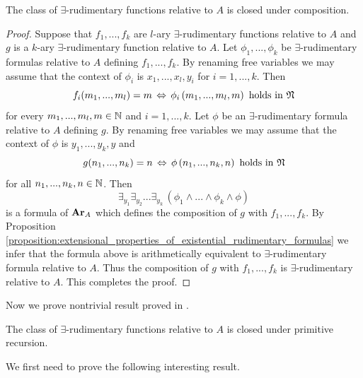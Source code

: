 \documentclass[10pt]{amsart}
\begin{document}
\begin{proposition}\label{proposition:class_of_existential_rudimentary_functions_is_closed_under_composition}
	The class of $\exists$-rudimentary functions relative to $A$ is closed under composition.
\end{proposition}
\begin{proof}
	Suppose that $f_1,...,f_k$ are $l$-ary $\exists$-rudimentary functions relative to $A$ and $g$ is a $k$-ary $\exists$-rudimentary function relative to $A$. Let $\phi_{1},...,\phi_{k}$ be $\exists$-rudimentary formulas relative to $A$ defining $f_1,...,f_k$. By renaming free variables we may assume that the context of $\phi_{i}$ is $x_1,...,x_l,y_i$ for $i = 1,...,k$. Then
	$$f_i(m_1,...,m_l) = m\,\Leftrightarrow\,\phi_{i}\left(m_1,...,m_l,m\right)\mbox{ holds in }{\mathfrak N}$$
	for every $m_1,...,m_l,m\in {\mathbb N}$ and $i = 1,...,k$. Let $\phi$ be an $\exists$-rudimentary formula relative to $A$ defining $g$. By renaming free variables we may assume that the context of $\phi$ is $y_1,...,y_k,y$ and
	$$g(n_1,...,n_k) = n\,\Leftrightarrow\,\phi\left(n_1,...,n_k,n\right)\mbox{ holds in }{\mathfrak N}$$
	for all $n_1,...,n_k,n\in {\mathbb N}$. Then
	$$\exists_{y_1}\exists_{y_2}...\exists_{y_k}\,\left(\phi_{1}\wedge ... \wedge \phi_{k}\wedge \phi\right)$$
	is a formula of $\mathbf{Ar}_A$ which defines the composition of $g$ with $f_1,...,f_k$. By Proposition \ref{proposition:extensional_properties_of_existential_rudimentary_formulas} we infer that the formula above is arithmetically equivalent to $\exists$-rudimentary formula relative to $A$. Thus the composition of $g$ with $f_1,...,f_k$ is $\exists$-rudimentary relative to $A$. This completes the proof.
\end{proof}
\noindent
Now we prove nontrivial result proved in \cite{godel1931formal}.

\begin{theorem}[G{\"o}del]\label{theorem:existential_rudimentary_are_closed_under_primitive_recursion}
	The class of $\exists$-rudimentary functions relative to $A$ is closed under primitive recursion.
\end{theorem}
\noindent
We first need to prove the following interesting result.
\end{document}
